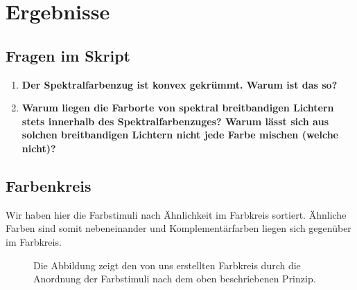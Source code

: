 \documentclass[11pt]{article}
\begin{document}
\section{Ergebnisse}
\subsection{Fragen im Skript}
\begin{enumerate}
\item \textbf{Der Spektralfarbenzug ist konvex gekrümmt. Warum ist das so?}

\item \textbf{Warum liegen die Farborte von spektral breitbandigen Lichtern stets innerhalb des Spektralfarbenzuges? Warum lässt sich aus solchen breitbandigen Lichtern nicht jede Farbe mischen (welche nicht)?}


\end{enumerate}

\subsection{Farbenkreis}
Wir haben hier die Farbstimuli nach Ähnlichkeit im Farbkreis sortiert. Ähnliche Farben sind somit nebeneinander und Komplementärfarben liegen sich gegenüber im Farbkreis. 
\begin{figure}[H]
\caption{Die Abbildung zeigt den von uns erstellten Farbkreis durch die Anordnung der Farbstimuli nach dem oben beschriebenen Prinzip.}
\label{farbkreis}
\end{figure}
\end{document}
